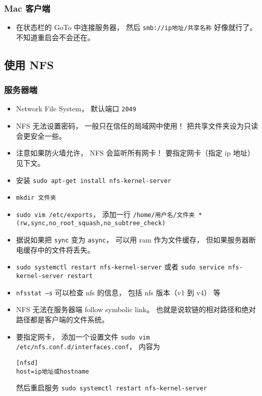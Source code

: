 \subsubsection{Mac 客户端}
\begin{itemize}
\item 在状态栏的 GoTo 中连接服务器， 然后 \verb|smb://ip地址/共享名称| 好像就行了。不知道重启会不会还在。
\end{itemize}

\subsection{使用 NFS}
\subsubsection{服务器端}
\begin{itemize}
\item Network File System， 默认端口 \verb|2049|
\item NFS 无法设置密码， 一般只在信任的局域网中使用！ 把共享文件夹设为只读会更安全一些。
\item 注意如果防火墙允许， NFS 会监听所有网卡！ 要指定网卡（指定 ip 地址）见下文。
\item 安装 \verb|sudo apt-get install nfs-kernel-server|
\item \verb|mkdir 文件夹|
\item \verb|sudo vim /etc/exports|， 添加一行 \verb|/home/用户名/文件夹 *(rw,sync,no_root_squash,no_subtree_check)|
\item 据说如果把 \verb|sync| 变为 \verb|async|， 可以用 ram 作为文件缓存， 但如果服务器断电缓存中的文件将丢失。
\item \verb|sudo systemctl restart nfs-kernel-server| 或者 \verb|sudo service nfs-kernel-server restart|
\item \verb|nfsstat –s| 可以检查 nfs 的信息， 包括 nfs 版本（v1 到 v4） 等
\item NFS 无法在服务器端 follow symbolic link。 也就是说软链的相对路径和绝对路径都是客户端的文件系统。
\item 要指定网卡， 添加一个设置文件 \verb|sudo vim /etc/nfs.conf.d/interfaces.conf|， 内容为
\begin{lstlisting}[language=none]
[nfsd]
host=ip地址或hostname
\end{lstlisting}
然后重启服务 \verb|sudo systemctl restart nfs-kernel-server|
\end{itemize}

